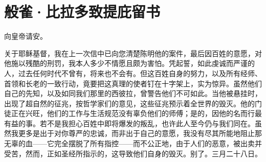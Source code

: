 
\chapter{般雀·比拉多致提庇留书}


\par

向皇帝请安。\par

关于耶稣基督，我在上一次信中已向您清楚陈明他的案件，最后因百姓的意愿，对他施以残酷的刑罚，我本人多少不情愿且颇为害怕。凭起誓，如此虔诚而严谨的人，过去任何时代不曾有，将来也不会有。但这百姓自身的努力，以及所有经师、首领和长老的一致行动，竟要把这真理的使者钉在十字架上，实为惊异。虽然他们自己的先知，以及如同我们那里的西彼拉，曾警告他们不可如此。当他被悬挂时，出现了超自然的征兆，按哲学家们的意见，这些征兆预示着全世界的毁灭。他的门徒正在兴旺，他们的工作与生活规范没有辜负他们的师傅；是的，因他的名而行最有益的事。若不是我担心百姓中即将爆发的叛乱，也许此人至今仍与我们同在。虽然我更多是出于对你尊严的忠诚，而非出于自己的意愿，我没有尽其所能地阻止那无辜的血——它完全摆脱了所有指控——而不公正地，由于人们的恶意，被出卖并受苦，然而，正如圣经所指示的，这导致他们自身的毁灭。别了。三月二十八日。\par


